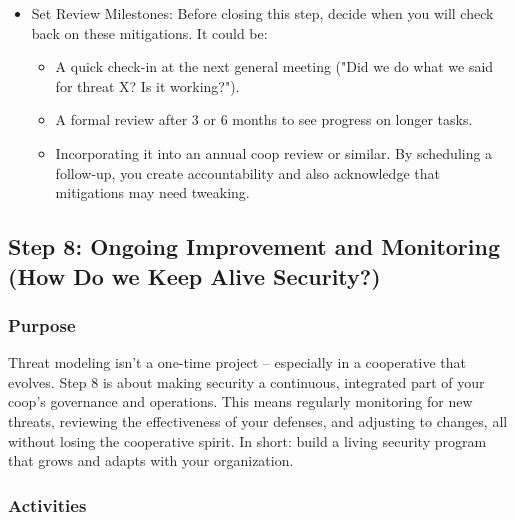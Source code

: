 \begin{itemize}
    \item Set Review Milestones: Before closing this step, decide when you will check back on these mitigations.
    It could be:
        \begin{itemize}   
            \item A quick check-in at the next general meeting ("Did we do what we said for threat X? Is it
    working?").
            \item A formal review after 3 or 6 months to see progress on longer tasks.
            \item Incorporating it into an annual coop review or similar. By scheduling a follow-up, you create
    accountability and also acknowledge that mitigations may need tweaking.
        \end{itemize}
    
\end{itemize}

\subsection{Step 8: Ongoing Improvement and Monitoring (How Do we Keep Alive Security?)}
\label{subsec:Step8}

\subsubsection{Purpose}

Threat modeling isn't a one-time project – especially in a cooperative that
evolves. Step 8 is about making security a continuous, integrated part of your
coop's governance and operations. This means regularly monitoring for new
threats, reviewing the effectiveness of your defenses, and adjusting to changes,
all without losing the cooperative spirit. In short: build a living security
program that grows and adapts with your organization.

\subsubsection{Activities}

